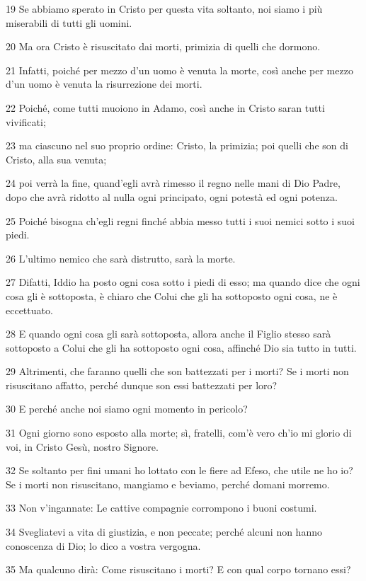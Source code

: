 \par 19 Se abbiamo sperato in Cristo per questa vita soltanto, noi siamo i più miserabili di tutti gli uomini.
\par 20 Ma ora Cristo è risuscitato dai morti, primizia di quelli che dormono.
\par 21 Infatti, poiché per mezzo d'un uomo è venuta la morte, così anche per mezzo d'un uomo è venuta la risurrezione dei morti.
\par 22 Poiché, come tutti muoiono in Adamo, così anche in Cristo saran tutti vivificati;
\par 23 ma ciascuno nel suo proprio ordine: Cristo, la primizia; poi quelli che son di Cristo, alla sua venuta;
\par 24 poi verrà la fine, quand'egli avrà rimesso il regno nelle mani di Dio Padre, dopo che avrà ridotto al nulla ogni principato, ogni potestà ed ogni potenza.
\par 25 Poiché bisogna ch'egli regni finché abbia messo tutti i suoi nemici sotto i suoi piedi.
\par 26 L'ultimo nemico che sarà distrutto, sarà la morte.
\par 27 Difatti, Iddio ha posto ogni cosa sotto i piedi di esso; ma quando dice che ogni cosa gli è sottoposta, è chiaro che Colui che gli ha sottoposto ogni cosa, ne è eccettuato.
\par 28 E quando ogni cosa gli sarà sottoposta, allora anche il Figlio stesso sarà sottoposto a Colui che gli ha sottoposto ogni cosa, affinché Dio sia tutto in tutti.
\par 29 Altrimenti, che faranno quelli che son battezzati per i morti? Se i morti non risuscitano affatto, perché dunque son essi battezzati per loro?
\par 30 E perché anche noi siamo ogni momento in pericolo?
\par 31 Ogni giorno sono esposto alla morte; sì, fratelli, com'è vero ch'io mi glorio di voi, in Cristo Gesù, nostro Signore.
\par 32 Se soltanto per fini umani ho lottato con le fiere ad Efeso, che utile ne ho io? Se i morti non risuscitano, mangiamo e beviamo, perché domani morremo.
\par 33 Non v'ingannate: Le cattive compagnie corrompono i buoni costumi.
\par 34 Svegliatevi a vita di giustizia, e non peccate; perché alcuni non hanno conoscenza di Dio; lo dico a vostra vergogna.
\par 35 Ma qualcuno dirà: Come risuscitano i morti? E con qual corpo tornano essi?

